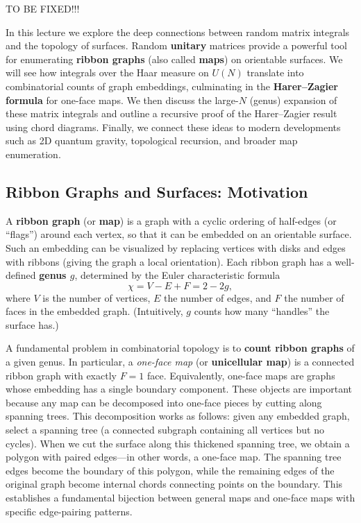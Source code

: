 \documentclass[letterpaper,11pt,oneside,reqno]{article}
\numberwithin{equation}{section}
\theoremstyle{definition}
\begin{document}
TO BE FIXED!!!


In this lecture we explore the deep connections between random matrix integrals and the topology of surfaces. Random \textbf{unitary} matrices provide a powerful tool for enumerating \textbf{ribbon graphs} (also called \textbf{maps}) on orientable surfaces. We will see how integrals over the Haar measure on $U(N)$ translate into combinatorial counts of graph embeddings, culminating in the \textbf{Harer–Zagier formula} for one-face maps. We then discuss the large-$N$ (genus) expansion of these matrix integrals and outline a recursive proof of the Harer–Zagier result using chord diagrams. Finally, we connect these ideas to modern developments such as 2D quantum gravity, topological recursion, and broader map enumeration.

\subsection*{Ribbon Graphs and Surfaces: Motivation}

A \textbf{ribbon graph} (or \textbf{map}) is a graph with a cyclic ordering of half-edges (or ``flags'') around each vertex, so that it can be embedded on an orientable surface. Such an embedding can be visualized by replacing vertices with disks and edges with ribbons (giving the graph a local orientation). Each ribbon graph has a well-defined \textbf{genus $g$}, determined by the Euler characteristic formula
\[ \chi = V - E + F = 2 - 2g, \]
where $V$ is the number of vertices, $E$ the number of edges, and $F$ the number of faces in the embedded graph. (Intuitively, $g$ counts how many ``handles'' the surface has.)

A fundamental problem in combinatorial topology is to \textbf{count ribbon graphs} of a given genus. In particular, a \emph{one-face map} (or \textbf{unicellular map}) is a connected ribbon graph with exactly $F=1$ face. Equivalently, one-face maps are graphs whose embedding has a single boundary component. These objects are important because any map can be decomposed into one-face pieces by cutting along spanning trees. This decomposition works as follows: given any embedded graph, select a spanning tree (a connected subgraph containing all vertices but no cycles). When we cut the surface along this thickened spanning tree, we obtain a polygon with paired edges—in other words, a one-face map. The spanning tree edges become the boundary of this polygon, while the remaining edges of the original graph become internal chords connecting points on the boundary. This establishes a fundamental bijection between general maps and one-face maps with specific edge-pairing patterns.
\end{document}
